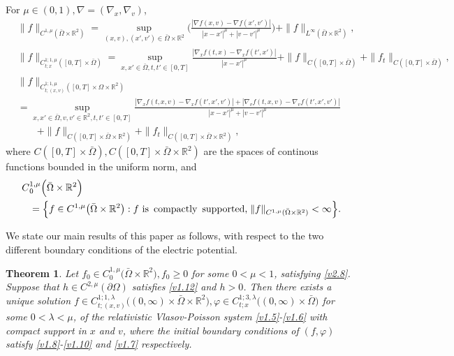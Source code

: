 \documentclass[11pt,reqno]{amsart}%
\newtheorem{Theorem}{Theorem}[section]
\theoremstyle{definition}
\theoremstyle{remark}
\begin{document}
For $\mu\in(0, 1), \nabla=(\nabla_{x},\nabla_{v})$,
  \begin{align}
  &\|f\|_{C^{1,\mu}(\bar{\Omega}\times \mathbb{R}^{2})}=\sup_{(x,v),(x',v')\in\bar{\Omega}\times \mathbb{R}^{2}}\Big(\frac{|\nabla f(x,v)-\nabla f(x',v')|}{|x-x'|^{\mu}+|v-v'|^{\mu}}\Big)
 +\|f\|_{L^{\infty}(\bar{\Omega}\times \mathbb{R}^{2})},\nonumber\\
  & \|f\|_{C^{1;1,\mu}_{t;x}([0,T]\times\bar{\Omega} )}=\sup_{x,x'\in\bar{\Omega},t,t'\in[0,T]}\frac{|\nabla_{x} f(t,x)-\nabla_{x} f(t',x')|}{|x-x'|^{\mu}}
  +\|f\|_{C([0,T]\times\bar{\Omega})} %
  +\|f_{t}\|_{C([0,T]\times\bar{\Omega})},\nonumber\\
  & \|f\|_{C^{1;1,\mu}_{t;(x,v)}([0,T]\times\Omega\times\mathbb{R}^{2})}\nonumber\\
  &=\sup_{x,x'\in\bar{\Omega},v,v'\in\mathbb{R}^{2}, t,t'\in[0,T]}
  \frac{|\nabla_{x} f(t,x,v)-\nabla_{x} f(t',x',v')|+|\nabla_{v} f(t,x,v)-\nabla_{v} f(t',x',v')|}{|x-x'|^{\mu}+|v-v'|^{\mu}}
  \nonumber\\
  &\qquad+\|f\|_{C([0,T]\times\bar{\Omega}\times\mathbb{R}^{2})}+\|f_{t}\|_{C([0,T]\times\bar{\Omega}\times\mathbb{R}^{2})},\nonumber
  \end{align}
 where $C([0,T]\times\bar{\Omega}),C([0,T]\times\bar{\Omega}\times\mathbb{R}^{2})$ are the spaces of continous functions bounded in the uniform norm, and
\begin{align}
 C&^{1,\mu}_{0}\Big(\bar{\Omega}\times \mathbb{R}^{2}\Big)\nonumber\\
 &=\Big\{f\in C^{1,\mu}\big(\bar{\Omega}\times \mathbb{R}^{2}\big):f \,\,\text{is \,compactly \,supported,}\;  \|f\|_{C^{1,\mu}(\bar{\Omega}\times \mathbb{R}^{2})}<\infty \Big\}.\nonumber
 \end{align}


We state  our main results of this paper as follows, with respect to the two different boundary conditions of the electric potential.
\begin{Theorem}\label{T1}
 Let $f_{0} \in C^{1,\mu}_{0}\big(\bar{\Omega}\times\mathbb{R}^{2}\big), f_{0}\geq 0$ for some $0 <\mu< 1$, satisfying
\eqref{v2.8}.  Suppose that $h \in C^{2,\mu} (\partial\Omega)$ satisfies \eqref{v1.12} and $h > 0$. Then there exists
a unique solution $f \in C^{1;1,\lambda}_{t;(x,v)} \big((0,\infty)\times \bar{\Omega}\times \mathbb{R}^{2}\big),
\varphi\in  C^{1;3,\lambda}_{t;x}\big((0,\infty)\times \bar{\Omega}\big) $
for
some $0 < \lambda < \mu$, of the relativistic Vlasov-Poisson system \eqref{v1.5}-\eqref{v1.6} with compact support
in $x$ and $v$, where the  initial boundary conditions of $(f,\varphi)$ satisfy \eqref{v1.8}-\eqref{v1.10} and \eqref{v1.7}  respectively.
\end{Theorem}
\end{document}
